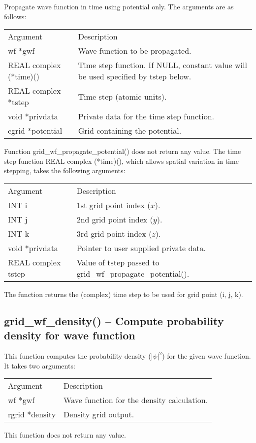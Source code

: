 \documentclass[12pt,letterpaper]{report}
\begin{document}
Propagate wave function in time using potential only. The arguments are as follows:
\begin{longtable}{p{} p{}}
Argument & Description\\
\cline{1-2}
wf *gwf & Wave function to be propagated.\\
REAL complex (*time)() & Time step function. If NULL, constant value will be used specified by tstep below.\\
REAL complex *tstep & Time step (atomic units).\\
void *privdata & Private data for the time step function.\\                                                                            
cgrid *potential & Grid containing the potential.\\
\end{longtable}
\noindent
Function grid\_wf\_propagate\_potential() does not return any value. The time step function REAL complex (*time)(), which allows spatial variation in time stepping, takes the following arguments:
\begin{longtable}{p{} p{}}
Argument & Description\\
\cline{1-2}
INT i & 1st grid point index ($x$).\\
INT j & 2nd grid point index ($y$).\\
INT k & 3rd grid point index ($z$).\\
void *privdata & Pointer to user supplied private data.\\
REAL complex tstep & Value of tstep passed to grid\_wf\_propagate\_potential().\\
\end{longtable}
\noindent
The function returns the (complex) time step to be used for grid point (i, j, k).

\subsection{grid\_wf\_density() -- Compute probability density for wave function}

This function computes the probability density ($|\psi|^2$) for the given wave function. It takes two arguments:
\begin{longtable}{p{} p{}}
Argument & Description\\
\cline{1-2}
wf *gwf & Wave function for the density calculation.\\
rgrid *density & Density grid output.\\
\end{longtable}
\noindent
This function does not return any value.
\end{document}
